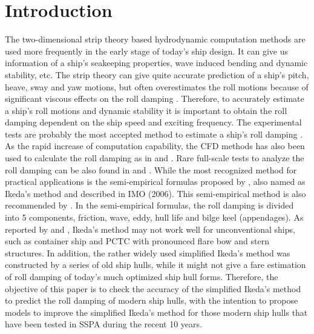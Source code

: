 \section{Introduction}
\label{se:introduction}

%    

The two-dimensional strip theory based hydrodynamic computation methods are used more frequently in the early stage of today's ship design. It can give us information of a ship's seakeeping properties, wave induced bending and dynamic stability, etc. The strip theory can give quite accurate prediction of a ship's pitch, heave, sway and yaw motions, but often overestimates the roll motions because of significant viscous effects on the roll damping \parencite{kawahara_simple_2011}. Therefore, to accurately estimate a ship's roll motions and dynamic stability it is important to obtain the roll damping dependent on the ship speed and exciting frequency. The experimental tests are probably the most accepted method to estimate a ship's roll damping \parencite{imo_1200_2006}. As the rapid increase of computation capability, the CFD methods has also been used to calculate the roll damping as in \parencite{kristiansen_experimental_2014} and \parencite{henry_peter_piehl_ship_2016}. Rare full-scale tests to analyze the roll damping can be also found in \parencite{schmitke_ship_1978} and \parencite{soder_assessment_2019}. While the most recognized method for practical applications is the semi-empirical formulas proposed by  \parencite{ikeda_eddy_1978,ikeda_components_1978,ikeda_roll_1979,ikeda_velocity_1979}, also named as Ikeda's method and described in IMO (2006). This semi-empirical method is also recommended by \parencite{ittc_ittc_2011}. In the semi-empirical formulas, the roll damping is divided into 5 components, friction, wave, eddy, hull life and bilge keel (appendages). As reported by  \parencite{kawahara_simple_2011} and \parencite{soder_ikeda_2019}, Ikeda's method may not work well for unconventional ships, such as container ship and PCTC with pronounced flare bow and stern structures. In addition, the rather widely used simplified Ikeda's method \parencite{kawahara_simple_2011} was constructed by a series of old ship hulls, while it might not give a fare estimation of roll damping of today's much optimized ship hull forms. 
Therefore, the objective of this paper is to check the accuracy of the simplified Ikeda's method to predict the roll damping of modern ship hulls, with the intention to propose models to improve the simplified Ikeda's method for those modern ship hulls that have been tested in SSPA during the recent 10 years.

